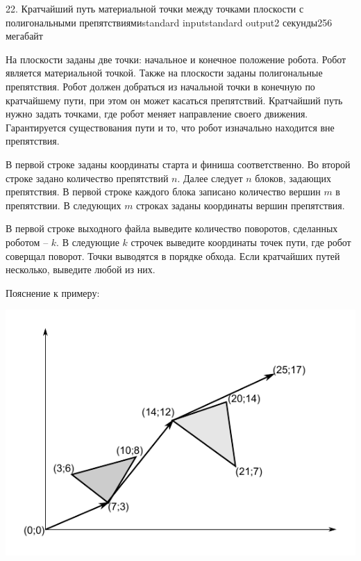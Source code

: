 \begin{problem}{22. Кратчайший путь материальной точки между точками плоскости с полигональными препятствиями}{standard input}{standard output}{2 секунды}{256 мегабайт}

На плоскости заданы две точки: начальное и конечное положение робота. Робот является материальной точкой. Также на плоскости заданы полигональные препятствия. 
Робот должен добраться из начальной точки в конечную по кратчайшему пути, при этом он может касаться препятствий.
Кратчайший путь нужно задать точками, где робот меняет направление своего движения. Гарантируется существования пути и то, что робот изначально находится вне препятствия.
  
\InputFile
В первой строке заданы координаты старта и финиша соответственно.
Во второй строке задано количество препятствий $n$.
Далее следует $n$ блоков, задающих препятствия.
В первой строке каждого блока записано количество вершин $m$ в препятствии. В следующих $m$ строках заданы координаты вершин препятствия.

\OutputFile

В первой строке выходного файла выведите количество поворотов, сделанных роботом -- $k$.
В следующие $k$ строчек выведите координаты точек пути, где робот соверщал поворот. Точки выводятся в порядке обхода. 
Если кратчайших путей несколько, выведите любой из них.
\Examples

\begin{example}%
%
\end{example}

\Note
Пояснение к примеру:
\begin{center}
	\includegraphics{example.pdf}
\end{center}
\end{problem}